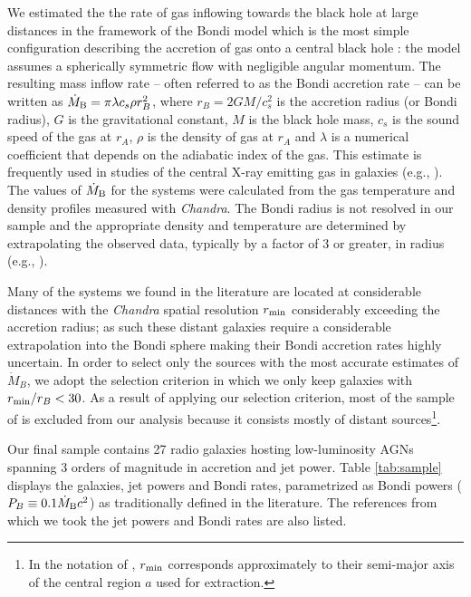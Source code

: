 \documentclass[useAMS,usenatbib]{mn2e}
\begin{document}
We estimated the the rate of gas inflowing towards the black hole at large distances in the framework of the Bondi model which is the most simple configuration describing the accretion of gas onto a central black hole \citep{Bondi52}: the model assumes a spherically symmetric flow with negligible angular momentum. The resulting mass inflow rate -- often referred to as the Bondi accretion rate -- can be written as $\dot{M}_{\rm B}=\pi \lambda c_s \rho r^2_B$, where $r_B=2GM/c_s^2$ is the accretion radius (or Bondi radius), $G$ is the gravitational constant, $M$ is the black hole mass, $c_s$ is the sound speed of the gas at $r_A$, $\rho$ is the density of gas at $r_A$ and $\lambda$ is a numerical coefficient that depends on the adiabatic index of the gas. This estimate is frequently used in studies of the central X-ray emitting gas in galaxies (e.g., \citealt{Wang13,Wong14}). The values of $\dot{M}_{\rm B}$ for the systems were calculated from the  gas temperature and density profiles measured with \emph{Chandra}. The Bondi radius is not resolved in our sample and the appropriate density and temperature are determined by extrapolating the observed data, typically by a factor of 3
or greater, in radius (e.g., \citealt{Russell13}). 

Many of the systems we found in the literature are located at considerable distances with the \emph{Chandra} spatial resolution $r_{\rm min}$ considerably exceeding the accretion radius; as such these distant galaxies require a considerable extrapolation into the Bondi sphere making their Bondi accretion rates highly uncertain. In order to select only the sources with the most accurate estimates of $\dot{M}_B$, we adopt the selection criterion in which we only keep galaxies with $r_{\rm min}/r_B<30$. 
As a result of applying our selection criterion, most of the sample of \cite{Rafferty06} is excluded from our analysis because it consists mostly of distant sources\footnote{In the notation of \cite{Rafferty06}, $r_{\rm min}$ corresponds approximately to their semi-major axis of the central region $a$ used for extraction.}. 

Our final sample contains 27 radio galaxies hosting low-luminosity AGNs spanning 3 orders of magnitude in accretion and jet power. Table \ref{tab:sample} displays the galaxies, jet powers and Bondi rates, parametrized as Bondi powers ($P_B \equiv 0.1 \dot{M}_{\rm B} c^2$) as traditionally defined in the literature. The references from which we took the jet powers and Bondi rates are also listed. 
\end{document}
